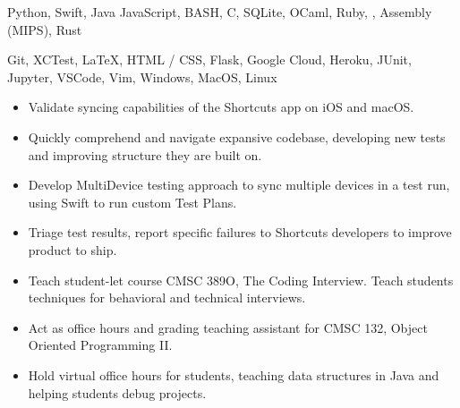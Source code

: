 \documentclass[11pt]{article}
\begin{document}
\setlength\topsep{0pt}
{\fontsize{10}{12}\robotocondlight
     Python, Swift, Java  JavaScript, BASH, C, SQLite, OCaml, Ruby, , Assembly (MIPS), Rust \par
    Git, XCTest, \LaTeX, HTML / CSS, Flask, Google Cloud, Heroku, JUnit, Jupyter, VSCode, Vim, Windows, MacOS, Linux \par
}

\hsep

\vspace{2mm}
{\fontsize{10}{12}\robotocondlight
    \begin{itemize}[noitemsep,nolistsep]
        \item Validate syncing capabilities of the Shortcuts app on iOS and macOS. 
        \item Quickly comprehend and navigate expansive codebase, developing new tests and improving structure they are built on. 
        \item Develop MultiDevice testing approach to sync multiple devices in a test run, using Swift to run custom Test Plans.
        \item Triage test results, report specific failures to Shortcuts developers to improve product to ship.
    \end{itemize}
    \vspace{3mm}
    \begin{itemize}[noitemsep,nolistsep]
        \item Teach student-let course CMSC 389O, The Coding Interview. Teach students techniques for behavioral and technical interviews. 
        \item Act as office hours and grading teaching assistant for CMSC 132, Object Oriented Programming II.
        \item Hold virtual office hours for students, teaching data structures in Java and helping students debug projects.
    \end{itemize}
    \vspace{3mm}

}
\end{document}
